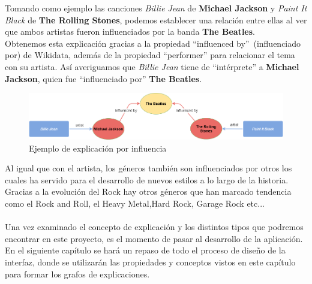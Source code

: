 Tomando como ejemplo las canciones \textit{Billie Jean} de \textbf{Michael Jackson} y \textit{Paint It Black} de \textbf{The Rolling Stones}, podemos establecer una relación entre ellas al ver que ambos artistas fueron influenciados por la banda \textbf{The Beatles}.\\

Obtenemos esta explicación gracias a la propiedad ``influenced by''~(influenciado por) de Wikidata, además de la propiedad ``performer'' para relacionar el tema con su artista. Así averiguamos que \textit{Billie Jean} tiene de ``intérprete'' a \textbf{Michael Jackson}, quien fue ``influenciado por'' \textbf{The Beatles}.\\

\begin{figure}[h!]
	\centering
	\includegraphics[width = 1\textwidth]{Imagenes/Bitmap/Influencia ejemplo.png}
	\caption{Ejemplo de explicación por influencia}
	\label{fig:sampleImage}
\end{figure}

Al igual que con el artista, los géneros también son influenciados por otros los cuales ha servido para el desarrollo de nuevos estilos a lo largo de la historia. Gracias a la evolución del Rock hay otros géneros que han marcado tendencia como el Rock and Roll, el Heavy Metal,Hard Rock, Garage Rock etc...\\\\


Una vez examinado el concepto de explicación y los distintos tipos que podremos encontrar en este proyecto, es el momento de pasar al desarrollo de la aplicación. En el siguiente capítulo se hará un repaso de todo el proceso de diseño de la interfaz, donde se utilizarán las propiedades y conceptos vistos en este capítulo para formar los grafos de explicaciones.\\
